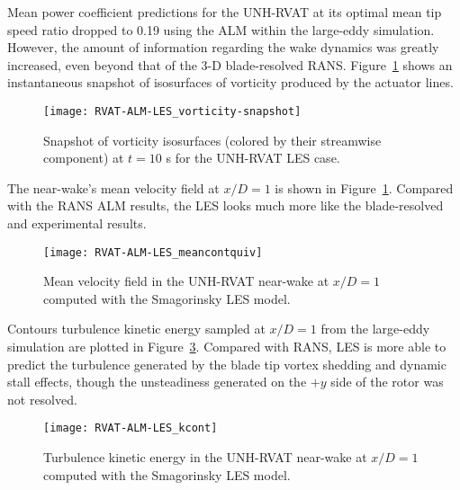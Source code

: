 Mean power coefficient predictions for the UNH-RVAT at its optimal mean tip
speed ratio dropped to 0.19 using the ALM within the large-eddy simulation.
However, the amount of information regarding the wake dynamics was greatly
increased, even beyond that of the 3-D blade-resolved RANS.
Figure~\ref{RVAT-ALM-LES-vorticity} shows an instantaneous snapshot of
isosurfaces of vorticity produced by the actuator lines.

\begin{figure}
    \centering
    
    \texttt{[image: RVAT-ALM-LES\_vorticity-snapshot]}

    \caption{Snapshot of vorticity isosurfaces (colored by their streamwise
        component) at $t=10$ s for the UNH-RVAT LES case.}
    
    \label{RVAT-ALM-LES-vorticity}
\end{figure}

The near-wake's mean velocity field at $x/D=1$ is shown in
Figure~\ref{RVAT-ALM-LES-vorticity}. Compared with the RANS ALM results, the LES
looks much more like the blade-resolved and experimental results.

\begin{figure}
    \centering
    
    \texttt{[image: RVAT-ALM-LES\_meancontquiv]}
    
    \caption{Mean velocity field in the UNH-RVAT near-wake at $x/D=1$ computed
        with the Smagorinsky LES model.}
    
    \label{fig:RVAT-ALM-LES-meancontquiv}
\end{figure}

Contours turbulence kinetic energy sampled at $x/D=1$ from the large-eddy
simulation are plotted in Figure~\ref{fig:RVAT-ALM-LES-kcont}. Compared with
RANS, LES is more able to predict the turbulence generated by the blade tip
vortex shedding and dynamic stall effects, though the unsteadiness generated on
the $+y$ side of the rotor was not resolved.


\begin{figure}
    \centering
    
    \texttt{[image: RVAT-ALM-LES\_kcont]}
    
    \caption{Turbulence kinetic energy in the UNH-RVAT near-wake at $x/D=1$
        computed with the Smagorinsky LES model.}
    
    \label{fig:RVAT-ALM-LES-kcont}
\end{figure}

